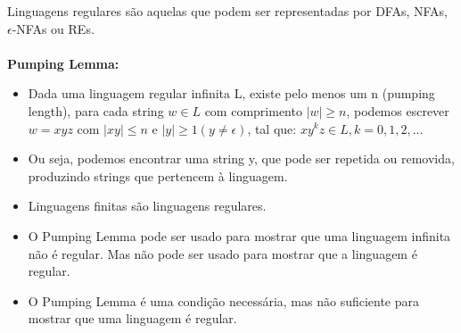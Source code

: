 \documentclass[../resumosTCOM.tex]{subfiles}
\begin{document}
 

Linguagens regulares são aquelas que podem ser representadas por DFAs, NFAs, $\epsilon$-NFAs ou REs.

\paragraph{}

\textbf{Pumping Lemma:}
\begin{itemize}
    \item Dada uma linguagem regular infinita L, existe pelo menos um n (pumping length), para cada string \(w \in L\) com comprimento \(|w| \geq n\), podemos escrever \(w = xyz\) com \(|xy| \leq n\) e \(|y| \geq 1 (y \neq \epsilon)\), tal que: \(xy^kz \in L, k = 0, 1, 2, ...\)
    \item Ou seja, podemos encontrar uma string y, que pode ser repetida ou removida, produzindo strings que pertencem à linguagem.
    \item Linguagens finitas são linguagens regulares.
    \item O Pumping Lemma pode ser usado para mostrar que uma linguagem infinita não é regular. Mas não pode ser usado para mostrar que a linguagem é regular.
    \item O Pumping Lemma é uma condição necessária, mas não suficiente para mostrar que uma linguagem é regular.
\end{itemize}

\paragraph{}
\end{document}
